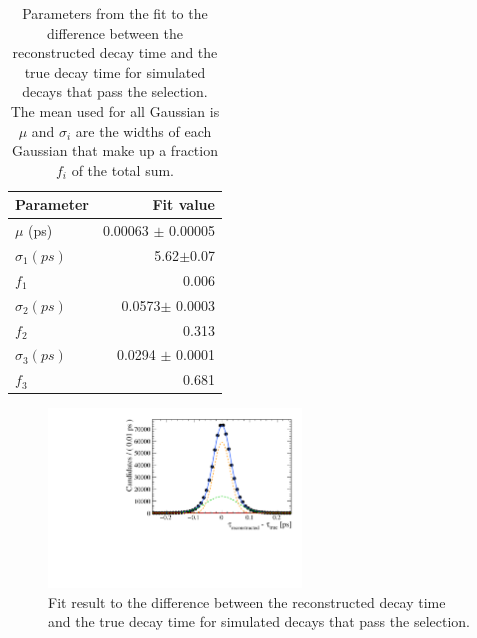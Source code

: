 \begin{table}[tb]
\begin{center}
\begin{tabular}{lr}
\toprule \toprule
Parameter               & Fit value             \\ \midrule
$\mu$ (ps)              & 0.00063 $\pm$ 0.00005 \\ \midrule
$\sigma_{1} (ps)$       & 5.62$\pm$0.07         \\ 
$f_{1}$                 & 0.006               \\ \midrule
$\sigma_{2} (ps)$       & 0.0573$\pm$ 0.0003    \\ 
$f_{2}$                 & 0.313                \\ \midrule
$\sigma_{3} (ps)$       & 0.0294 $\pm$ 0.0001   \\ 
$f_{3}$                 & 0.681                \\ \bottomrule \bottomrule
\end{tabular}
\vspace{0.7cm}                                                                                    
\caption{Parameters from the fit to the difference between the reconstructed decay time and the true decay time for simulated decays that pass the \bsmumu \el selection. The mean used for all Gaussian is $\mu$ and $\sigma_{i}$ are the widths of each Gaussian that make up a fraction $f_{i}$ of the total sum.}
\label{tab:resolutionfit}
\end{center}
\vspace{-1.0cm}                                                                                   
\end{table}

\begin{figure}[tbp]
  \centering
    \includegraphics[width=0.6\textwidth]{./Figs/LifetimeSystematics/PV_decaytime_diff_fit.pdf}
  \caption{Fit result to the difference between the reconstructed decay time and the true decay time for simulated decays that pass the \bsmumu \el selection.}
  \label{fig:PVfit}
\end{figure}


